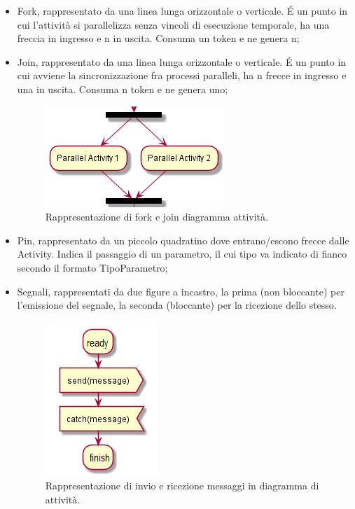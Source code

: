 \documentclass[NormeDiProgetto.tex]{subfiles}
\begin{document}
\begin{itemize}
\item Fork, rappresentato da una linea lunga orizzontale o verticale. \'E un punto in cui l'attività si parallelizza senza vincoli di esecuzione temporale, ha una freccia in ingresso e n in uscita. Consuma un token e ne genera n;
\item Join, rappresentato da una linea lunga orizzontale o verticale. \'E un punto in cui avviene la sincronizzazione fra processi paralleli, ha n frecce in ingresso e una in uscita. Consuma n token e ne genera uno;
\begin{figure}[H]
	\centering
	\includegraphics[width=0.4\linewidth]{progettazione/activityparall}
	\caption{Rappresentazione di fork e join diagramma attività.}
	\label{fig:activityparall}
\end{figure}

\item Pin, rappresentato da un piccolo quadratino dove entrano/escono frecce dalle Activity. Indica il passaggio di un parametro, il cui tipo va indicato di fianco secondo il formato TipoParametro;
\item Segnali, rappresentati da due figure a incastro, la prima (non bloccante) per
l'emissione del segnale, la seconda (bloccante) per la ricezione dello stesso.
\begin{figure}[H]
	\centering
	\includegraphics[width=0.3\linewidth]{progettazione/message}
	\caption{Rappresentazione di invio e ricezione messaggi in diagramma di attività.}
	\label{fig:message}
\end{figure}


\end{itemize}
\end{document}
